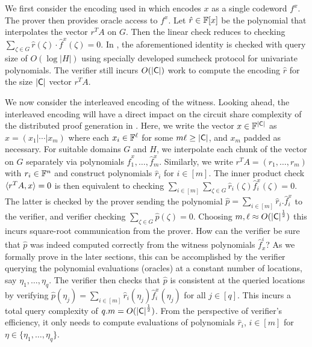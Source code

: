 	We first consider the encoding used in \cite{Aurora} which encodes $x$ as a single codeword $f^x$. The prover then provides oracle access to $f^x$. Let $\hat{r}\in\mathbb{F}[x]$ be the polynomial that interpolates the vector $r^TA$ on $G$. Then the linear check reduces to checking $\sum_{\zeta\in G}\hat{r}(\zeta) \cdot \hat{f}^x(\zeta) = 0$. In \cite{Aurora}, the aforementioned identity is checked with query size of $O(\log|H|)$ using specially developed sumcheck protocol for univariate polynomials. The verifier still incurs $O(\mathsf{|C|})$ work to compute the encoding $\hat{r}$ for the size $\mathsf{|C|}$ vector $r^TA$. 
	
	We now consider the interleaved encoding of the witness. Looking ahead, the interleaved encoding will have a direct impact on the circuit share complexity of the distributed proof generation in \name{}. Here, we write the vector $x\in \mathbb{F}^{\mathsf{|C|}}$ as $x=(x_1|\cdots|x_m)$ where each $x_i\in \mathbb{F}^\ell$ for some $m\ell \geq \mathsf{|C|}$, and $x_m$ padded as necessary. For suitable domains $G$ and $H$, we interpolate each chunk of the vector on $G$ 
	separately via polynomials $\hat{f}^x_1,\ldots,\hat{f}^x_m$. Similarly, we write $r^TA=(r_1,\ldots,r_m)$ with $r_i\in \mathbb{F}^n$ and construct polynomials $\hat{r}_i$	for $i\in [m]$. The inner product check $\langle r^TA,x\rangle=0$ is then equivalent to checking $\sum_{i\in [m]}\sum_{\zeta\in G}\hat{r}_i(\zeta)\hat{f}^x_i(\zeta)=0$. The	latter is checked by the prover sending the polynomial $\hat{p}=\sum_{i\in
	[m]}\hat{r}_i.\hat{f}^x_i$ to the verifier, and verifier checking $\sum_{\zeta\in G}\hat{p}(\zeta)=0$. Choosing $m,\ell\approx O(\mathsf{|C|}^\frac{1}{2})$ this incurs square-root communication from the prover. How can the verifier be sure that $\hat{p}$ was indeed computed correctly from the witness polynomials $\hat{f}^i_x$? As we formally prove in the later sections, this can be accomplished by the verifier querying the polynomial evaluations (oracles) at a constant number of locations, say $\eta_1,\ldots,\eta_q$. The verifier then checks
	that $\hat{p}$ is consistent at the queried locations by verifying $\hat{p}(\eta_j)=\sum_{i\in [m]}\hat{r}_i(\eta_j)\hat{f}^x_i(\eta_j)$ for
	all $j\in [q]$. This incurs a total query complexity of $q.m=O(\mathsf{|C|}^\frac{1}{2})$.	
	From the perspective of verifier's efficiency, it only needs to compute evaluations of polynomials $\hat{r}_i$, $i\in [m]$ for $\eta\in \{\eta_1,\ldots,\eta_q\}$. %


